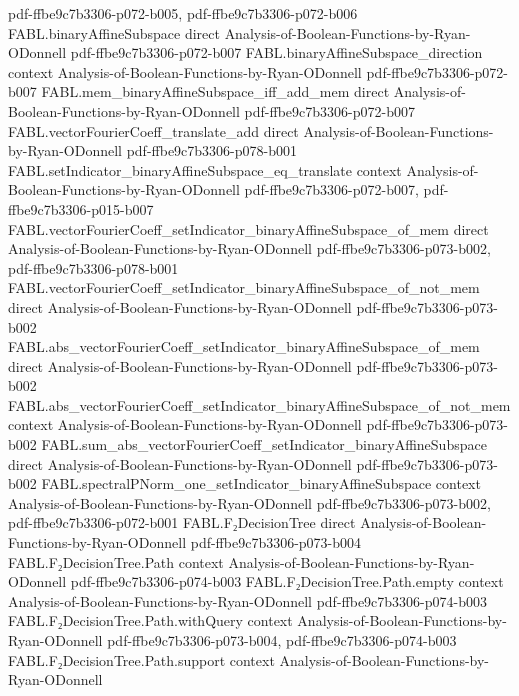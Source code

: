\begin{theorem}
  {pdf-ffbe9c7b3306-p072-b005,
    pdf-ffbe9c7b3306-p072-b006}
\proofstep
  {FABL.binaryAffineSubspace}
  {direct}
  {Analysis-of-Boolean-Functions-by-Ryan-ODonnell}
  {pdf-ffbe9c7b3306-p072-b007}
\proofstep
  {FABL.binaryAffineSubspace_direction}
  {context}
  {Analysis-of-Boolean-Functions-by-Ryan-ODonnell}
  {pdf-ffbe9c7b3306-p072-b007}
\proofstep
  {FABL.mem_binaryAffineSubspace_iff_add_mem}
  {direct}
  {Analysis-of-Boolean-Functions-by-Ryan-ODonnell}
  {pdf-ffbe9c7b3306-p072-b007}
\proofstep
  {FABL.vectorFourierCoeff_translate_add}
  {direct}
  {Analysis-of-Boolean-Functions-by-Ryan-ODonnell}
  {pdf-ffbe9c7b3306-p078-b001}
\proofstep
  {FABL.setIndicator_binaryAffineSubspace_eq_translate}
  {context}
  {Analysis-of-Boolean-Functions-by-Ryan-ODonnell}
  {pdf-ffbe9c7b3306-p072-b007,
    pdf-ffbe9c7b3306-p015-b007}
\proofstep
  {FABL.vectorFourierCoeff_setIndicator_binaryAffineSubspace_of_mem}
  {direct}
  {Analysis-of-Boolean-Functions-by-Ryan-ODonnell}
  {pdf-ffbe9c7b3306-p073-b002,
    pdf-ffbe9c7b3306-p078-b001}
\proofstep
  {FABL.vectorFourierCoeff_setIndicator_binaryAffineSubspace_of_not_mem}
  {direct}
  {Analysis-of-Boolean-Functions-by-Ryan-ODonnell}
  {pdf-ffbe9c7b3306-p073-b002}
\proofstep
  {FABL.abs_vectorFourierCoeff_setIndicator_binaryAffineSubspace_of_mem}
  {direct}
  {Analysis-of-Boolean-Functions-by-Ryan-ODonnell}
  {pdf-ffbe9c7b3306-p073-b002}
\proofstep
  {FABL.abs_vectorFourierCoeff_setIndicator_binaryAffineSubspace_of_not_mem}
  {context}
  {Analysis-of-Boolean-Functions-by-Ryan-ODonnell}
  {pdf-ffbe9c7b3306-p073-b002}
\proofstep
  {FABL.sum_abs_vectorFourierCoeff_setIndicator_binaryAffineSubspace}
  {direct}
  {Analysis-of-Boolean-Functions-by-Ryan-ODonnell}
  {pdf-ffbe9c7b3306-p073-b002}
\proofstep
  {FABL.spectralPNorm_one_setIndicator_binaryAffineSubspace}
  {context}
  {Analysis-of-Boolean-Functions-by-Ryan-ODonnell}
  {pdf-ffbe9c7b3306-p073-b002,
    pdf-ffbe9c7b3306-p072-b001}
\proofstep
  {FABL.F₂DecisionTree}
  {direct}
  {Analysis-of-Boolean-Functions-by-Ryan-ODonnell}
  {pdf-ffbe9c7b3306-p073-b004}
\proofstep
  {FABL.F₂DecisionTree.Path}
  {context}
  {Analysis-of-Boolean-Functions-by-Ryan-ODonnell}
  {pdf-ffbe9c7b3306-p074-b003}
\proofstep
  {FABL.F₂DecisionTree.Path.empty}
  {context}
  {Analysis-of-Boolean-Functions-by-Ryan-ODonnell}
  {pdf-ffbe9c7b3306-p074-b003}
\proofstep
  {FABL.F₂DecisionTree.Path.withQuery}
  {context}
  {Analysis-of-Boolean-Functions-by-Ryan-ODonnell}
  {pdf-ffbe9c7b3306-p073-b004,
    pdf-ffbe9c7b3306-p074-b003}
\proofstep
  {FABL.F₂DecisionTree.Path.support}
  {context}
  {Analysis-of-Boolean-Functions-by-Ryan-ODonnell}

\end{theorem}

